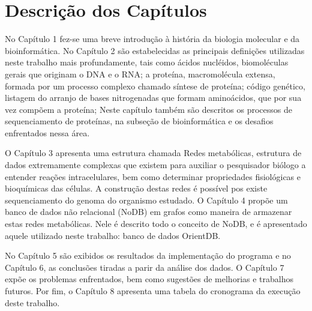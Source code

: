 \section{Descrição dos Capítulos}

\indent No Capítulo 1 fez-se uma breve introdução à história da biologia molecular e da bioinformática. No Capítulo 2 são estabelecidas as principais definições utilizadas neste trabalho mais profundamente, tais como ácidos nucléidos, biomoléculas gerais que originam o DNA e o RNA; a proteína, macromolécula extensa, formada por um processo complexo chamado síntese de proteína; código genético, listagem do arranjo de bases nitrogenadas que formam aminoácidos, que por sua vez compõem a proteína; Neste capítulo também são descritos os processos de sequenciamento de proteínas, na subseção de bioinformática e os desafios enfrentados nessa área.

\indent O Capítulo 3 apresenta uma estrutura chamada Redes metabólicas, estrutura de dados extremamente complexas que existem para auxiliar o pesquisador biólogo a entender reações intracelulares, bem como determinar propriedades fisiológicas e bioquímicas das células. A construção destas redes é possível pos existe sequenciamento do genoma do organismo estudado. O Capítulo 4 propõe um banco de dados não relacional (NoDB) em grafos como maneira de armazenar estas redes metabólicas. Nele é descrito todo o conceito de NoDB, e é apresentado aquele utilizado neste trabalho: banco de dados OrientDB.

\indent No Capítulo 5 são exibidos os resultados da implementação do programa e no Capítulo 6, as conclusões tiradas a parir da análise dos dados. O Capítulo 7 expõe os problemas enfrentados, bem como sugestões de melhorias e trabalhos futuros. Por fim, o Capítulo 8 apresenta uma tabela do cronograma da execução deste trabalho.
